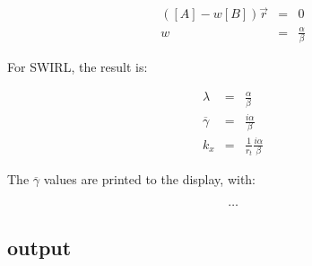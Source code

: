 \documentclass[12pt]{article}
\begin{document}
\begin{eqnarray}
\left(\left[A \right] - w \left[B \right] \right) \vec{r} &=& 0
\nonumber
\\
w &=& \frac{\alpha}{\beta}
\nonumber
\end{eqnarray}

For SWIRL, the result is:

\begin{eqnarray}
\lambda &=& \frac{\alpha}{\beta}
\nonumber
\\
\overline{\gamma} &=& \frac{i \alpha}{\beta}
\nonumber
\\
k_x &=& \frac{1}{r_t} \frac{i \alpha}{\beta}
\nonumber
\end{eqnarray}

The $\overline{\gamma}$ values are printed to the display,
with:

\begin{eqnarray}
\ldots
\end{eqnarray}


\subsection{output}



% 
\end{document}
